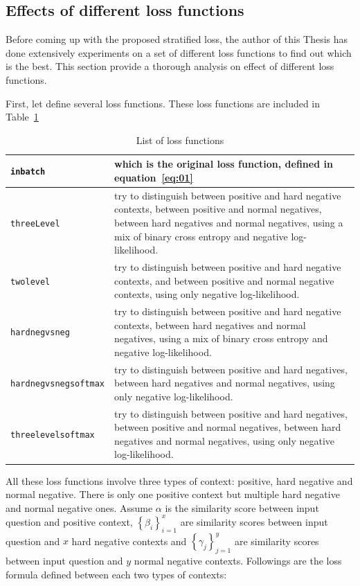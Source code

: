 \documentclass[12pt, sort&compress]{report}
\begin{document}
\subsection{Effects of different loss functions}
\label{sec:4.4.1}
Before coming up with the proposed stratified loss, the author of this Thesis has done extensively experiments on a set of different loss functions to find out which is the best. This section provide a thorough analysis on effect of different loss functions.
\par First, let define several loss functions. These loss functions are included in Table~\ref{tab:03}
\begin{table}
	\caption{List of loss functions}
	\label{tab:03}
	\centering
	\begin{tabular}{p{.3\linewidth}p{.6\linewidth}}
		\hline
		{\tt inbatch} & which is the original loss function, defined in equation~\eqref{eq:01} \\\hline
		{\tt threeLevel} & try to distinguish between positive and hard negative contexts, between positive and normal negatives, between hard negatives and normal negatives, using a mix of binary cross entropy and negative log-likelihood. \\\hline
		{\tt twolevel} & try to distinguish between positive and hard negative contexts, and between positive and normal negative contexts, using only negative log-likelihood.\\\hline
		{\tt hardnegvsneg} & try to distinguish between positive and hard negative contexts, between hard negatives and normal negatives, using a mix of binary cross entropy and negative log-likelihood.\\\hline
		{\tt hardnegvsnegsoftmax} & try to distinguish between positive and hard negatives, between hard negatives and normal negatives, using only negative log-likelihood.\\\hline
		{\tt threelevelsoftmax} & try to distinguish between positive and hard negatives, between positive and normal negatives, between hard negatives and normal negatives, using only negative log-likelihood.\\\hline
		
	\end{tabular}
\end{table}
\par All these loss functions involve three types of context: positive, hard negative and normal negative. There is only one positive context but multiple hard negative and normal negative ones. Assume $\alpha$ is the similarity score between input question and positive context, $\left\{\beta_i\right\}_{i=1}^x$ are similarity scores between input question and $x$ hard negative contexts and $\left\{\gamma_j\right\}_{j=1}^y$ are similarity scores between input question and $y$ normal negative contexts. Followings are the loss formula defined between each two types of contexts:
\end{document}

